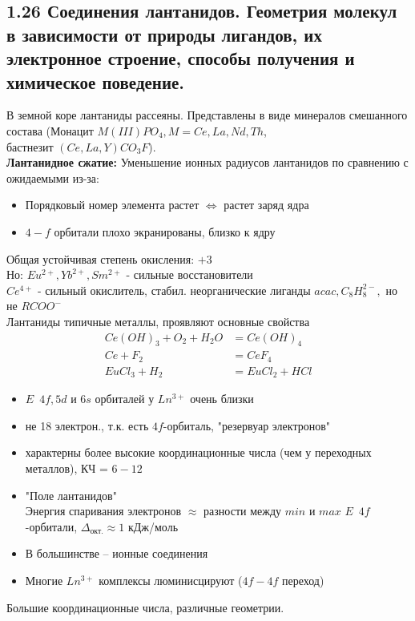 
\subsection{1.26 Соединения лантанидов. Геометрия молекул в зависимости от природы лигандов, их электронное строение, способы получения и химическое поведение.}
В земной коре лантаниды рассеяны. Представлены в виде минералов смешанного состава (Монацит $ M(III)PO_4, M = Ce, La, Nd, Th $, \\бастнезит $ (Ce, La, Y)CO_3F $).\\
\textbf{Лантанидное сжатие:}
Уменьшение ионных радиусов лантанидов по сравнению с ожидаемыми из-за:
\begin{itemize}
	\item Порядковый номер элемента растет $\Leftrightarrow$ растет заряд ядра
	\item $4-f$ орбитали плохо экранированы, близко к ядру
\end{itemize}
Общая устойчивая степень окисления: $+3$ \\
Но: $Eu^{2+}, Yb^{2+}, Sm^{2+}$ - сильные  восстановители \\
$Ce^{4+}$ - сильный окислитель, стабил. неорганические лиганды $acac, C_8H_8^{2-},$ но не $RCOO^-$ \\
Лантаниды типичные металлы, проявляют основные свойства
\begin{align*}
Ce(OH)_3 + O_2 + H_2O &= Ce(OH)_4 \\
Ce + F_2 &= CeF_4 \\
EuCl_3 + H_2 &= EuCl_2  + HCl
\end{align*}
\begin{itemize}
	\item $E \,\,\, 4f, 5d$ и $6s$ орбиталей у $Ln^{3+}$ очень близки
	\item не 18 электрон., т.к. есть $4f$-орбиталь, "резервуар электронов"
	\item характерны более высокие координационные числа (чем у переходных металлов), КЧ = $6-12$
	\item "Поле лантанидов" \\
	Энергия спаривания электронов $\approx $ разности между $min$ и $max$ $E\,\,\, 4f$-орбитали, $\Delta_{\text{окт.}} \approx 1$ кДж/моль
	\item В большинстве -- ионные соединения
	\item Многие $Ln^{3+}$ комплексы люминисцируют ($4f-4f$ переход)
\end{itemize}
Большие координационные числа, различные геометрии. \\
